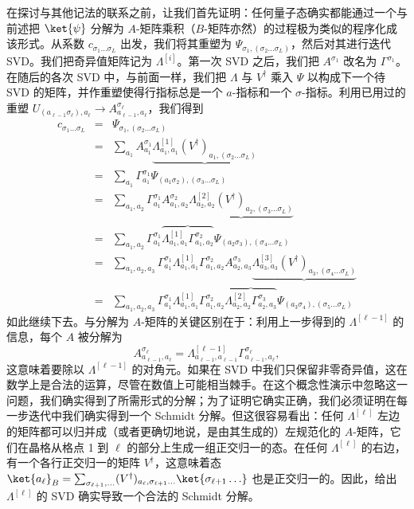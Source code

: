 在探讨与其他记法的联系之前，让我们首先证明：任何量子态确实都能通过一个与前述把 $\ket{\psi}$ 分解为 $A$-矩阵乘积（$B$-矩阵亦然）的过程极为类似的程序化成该形式。从系数 $c_{\sigma_1\ldots\sigma_L}$ 出发，我们将其重塑为 $\Psi_{\sigma_1, (\sigma_2 \ldots \sigma_L)}$，然后对其进行迭代 SVD。我们把奇异值矩阵记为 $\Lambda^{[i]}$。第一次 SVD 之后，我们把 $A^{\sigma_1}$ 改名为 $\Gamma^{\sigma_1}$。在随后的各次 SVD 中，与前面一样，我们把 $\Lambda$ 与 $V^\dagger$ 乘入 $\Psi$ 以构成下一个待 SVD 的矩阵，并作重塑使得行指标总是一个 $a$-指标和一个 $\sigma$-指标。利用已用过的重塑 $U_{(a_{\ell-1}\sigma_\ell), a_{\ell}} \rightarrow A^{\sigma_\ell}_{a_{\ell-1},a_\ell}$，我们得到
\begin{eqnarray*}
c_{\sigma_1\ldots\sigma_L} &=& \Psi_{\sigma_1, (\sigma_2 \ldots \sigma_L)} \\
&=& \sum_{a_1} A^{\sigma_1}_{a_1} \underbrace{\Lambda^{[1]}_{a_1,a_1} (V^\dagger)_{a_1, (\sigma_2 \ldots \sigma_L)}} \\
&=& \sum_{a_1} \Gamma^{\sigma_1}_{a_1} \Psi_{(a_1\sigma_2), (\sigma_3 \ldots \sigma_L)} \\
&=& \sum_{a_1,a_2} \Gamma^{\sigma_1}_{a_1} A^{\sigma_2}_{a_1,a_2} \underbrace{\Lambda^{[2]}_{a_2,a_2} (V^\dagger)_{a_2, (\sigma_3 \ldots \sigma_L)}} \\
&=& \sum_{a_1,a_2} \Gamma^{\sigma_1}_{a_1} \overbrace{\Lambda^{[1]}_{a_1,a_1} \Gamma^{\sigma_2}_{a_1,a_2}} \Psi_{(a_2\sigma_3), (\sigma_4 \ldots \sigma_L)} \\
&=& \sum_{a_1,a_2,a_3} \Gamma^{\sigma_1}_{a_1} \Lambda^{[1]}_{a_1,a_1} \Gamma^{\sigma_2}_{a_1,a_2} A^{\sigma_3}_{a_2,a_3}  \underbrace{\Lambda^{[3]}_{a_3,a_3} (V^\dagger)_{a_3, (\sigma_4 \ldots \sigma_L)}} \\ 
&=& \sum_{a_1,a_2,a_3} \Gamma^{\sigma_1}_{a_1} \Lambda^{[1]}_{a_1,a_1} \Gamma^{\sigma_2}_{a_1,a_2} \overbrace{\Lambda^{[2]}_{a_2,a_2} \Gamma^{\sigma_3}_{a_2,a_3}}  \Psi_{(a_3\sigma_4), (\sigma_5 \ldots \sigma_L)} 
\end{eqnarray*}
如此继续下去。与分解为 $A$-矩阵的关键区别在于：利用上一步得到的 $\Lambda^{[\ell-1]}$ 的信息，每个 $A$ 被分解为 
\begin{equation}
A^{\sigma_\ell}_{a_{\ell-1},a_\ell} = \Lambda^{[\ell-1]}_{a_{\ell-1},a_{\ell-1}} \Gamma^{\sigma_\ell}_{a_{\ell-1},a_\ell} ,
\label{eq:agammalambda}
\end{equation}
这意味着要除以 $\Lambda^{[\ell-1]}$ 的对角元。如果在 SVD 中我们只保留非零奇异值，这在数学上是合法的运算，尽管在数值上可能相当棘手。在这个概念性演示中忽略这一问题，我们确实得到了所需形式的分解；为了证明它确实正确，我们必须证明在每一步迭代中我们确实得到一个 Schmidt 分解。但这很容易看出：任何 $\Lambda^{[\ell]}$ 左边的矩阵都可以归并成（或者更确切地说，是由其生成的）左规范化的 $A$-矩阵，它们在晶格从格点 1 到 $\ell$ 的部分上生成一组正交归一的态。在任何 $\Lambda^{[\ell]}$ 的右边，有一个各行正交归一的矩阵 $V^\dagger$，这意味着态 $\ket{a_\ell}_B = \sum_{\sigma_{\ell+1},\ldots}
(V^\dagger)_{a_\ell, \sigma_{\ell+1} \ldots} \ket{\sigma_{\ell+1} \ldots}$ 也是正交归一的。因此，给出 $\Lambda^{[\ell]}$ 的 SVD 确实导致一个合法的 Schmidt 分解。

